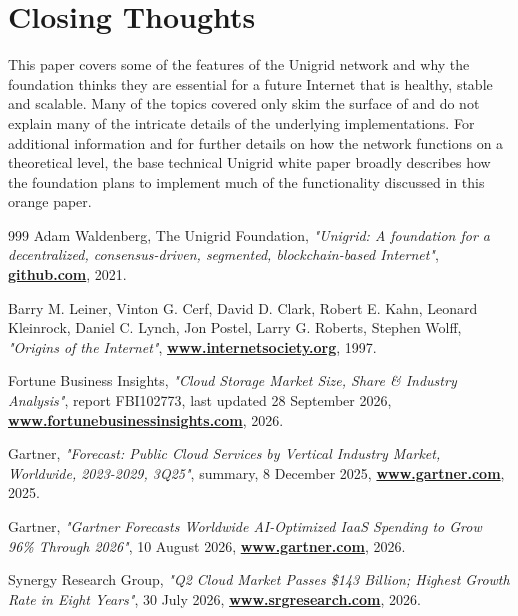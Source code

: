 \documentclass[a4paper,oneside]{article}
\let\oldhref\href
\renewcommand{\href}[2]{\oldhref{#1}{\bfseries#2}}
\begin{document}
\section{Closing Thoughts}
This paper covers some of the features of the Unigrid network and why the foundation thinks they are essential for a future Internet that is healthy, stable and scalable. Many of the topics covered only skim the surface of and do not explain many of the intricate details of the underlying implementations. For additional information and for further details on how the network functions on a theoretical level, the base technical Unigrid white paper \cite{wp2021} broadly describes how the foundation plans to implement much of the functionality discussed in this orange paper.

\newpage
\begin{thebibliography}{999}
    Adam Waldenberg, The Unigrid Foundation,
    \emph{"Unigrid: A foundation for a decentralized, consensus-driven, segmented, blockchain-based Internet"},
    \href{https://github.com/unigrid-project/documentation-white-paper}{github.com},
    2021.

    Barry M. Leiner, Vinton G. Cerf, David D. Clark, Robert E. Kahn, Leonard Kleinrock, Daniel C. Lynch, Jon Postel, Larry G. Roberts, Stephen Wolff,
    \emph{"Origins of the Internet"},
    \href{https://www.internetsociety.org/internet/history-internet/brief-history-internet}{www.internetsociety.org},
    1997.

    Fortune Business Insights,
    \emph{"Cloud Storage Market Size, Share \& Industry Analysis"},
    report FBI102773, last updated 28 September 2026,
    \href{https://www.fortunebusinessinsights.com/cloud-storage-market-102773}{www.fortunebusinessinsights.com},
    2026.

    Gartner,
    \emph{"Forecast: Public Cloud Services by Vertical Industry Market, Worldwide, 2023-2029, 3Q25"},
    summary, 8 December 2025,
    \href{https://www.gartner.com/en/documents/7259330}{www.gartner.com},
    2025.

    Gartner,
    \emph{"Gartner Forecasts Worldwide AI-Optimized IaaS Spending to Grow 96\% Through 2026"},
    10 August 2026,
    \href{https://www.gartner.com/en/newsroom/press-releases/2026-08-10-gartner-forecasts-worldwide-artificial-intelligence-optimized-iaas-spending-to-grow-96-percent-in-2026}{www.gartner.com},
    2026.

    Synergy Research Group,
    \emph{"Q2 Cloud Market Passes \$143 Billion; Highest Growth Rate in Eight Years"},
    30 July 2026,
    \href{https://www.srgresearch.com/articles/q2-cloud-market-passes-143-billion-highest-growth-rate-in-eight-years}{www.srgresearch.com},
    2026.


\end{thebibliography}
\end{document}
